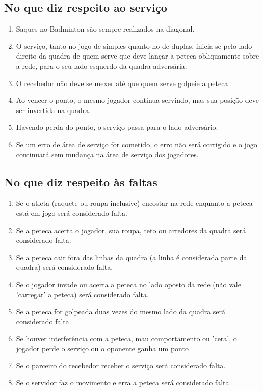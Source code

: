 \documentclass[
	article,			%
	11pt,				%
	oneside,			%
	a4paper,			%
	english,			%
	brazil,				%
	sumario=tradicional
	]{abntex2}
\begin{document}
\subsection{No que diz respeito ao serviço}
\begin{enumerate}
	\item Saques no Badminton são sempre realizados na diagonal. 
	\item O serviço, tanto no jogo de simples quanto no de duplas, inicia-se pelo lado direito da quadra de quem serve que deve lançar a peteca obliquamente sobre a rede, para o seu lado esquerdo da quadra adversária.
	\item O recebedor não deve se mexer até que quem serve golpeie a peteca
	\item Ao vencer o ponto, o mesmo jogador continua servindo, mas sua posição deve ser invertida na quadra.
	\item Havendo perda do ponto, o serviço passa para o lado adversário.
	\item Se um erro de área de serviço for cometido, o erro não será corrigido e o jogo continuará sem mudança na área de serviço dos jogadores. 
\end{enumerate}

\subsection{No que diz respeito às faltas}
\begin{enumerate}
	\item Se o atleta (raquete ou roupa inclusive) encostar na rede enquanto a peteca está em jogo será considerado falta.
	\item Se a peteca acerta o jogador, sua roupa, teto ou arredores da quadra será considerado falta.
	\item Se a peteca cair fora das linhas da quadra (a linha é considerada parte da quadra) será considerado falta.
	\item Se o jogador invade ou acerta a peteca no lado oposto da rede (não vale 'carregar' a peteca) será considerado falta.
	\item Se a peteca for golpeada duas vezes do mesmo lado da quadra será considerado falta.
	\item Se houver interferência com a peteca, mau comportamento ou 'cera', o jogador perde o serviço ou o oponente ganha um ponto
	\item Se o parceiro do recebedor receber o serviço será considerado falta.
	\item Se o servidor faz o movimento e erra a peteca será considerado falta.
\end{enumerate}
\end{document}
